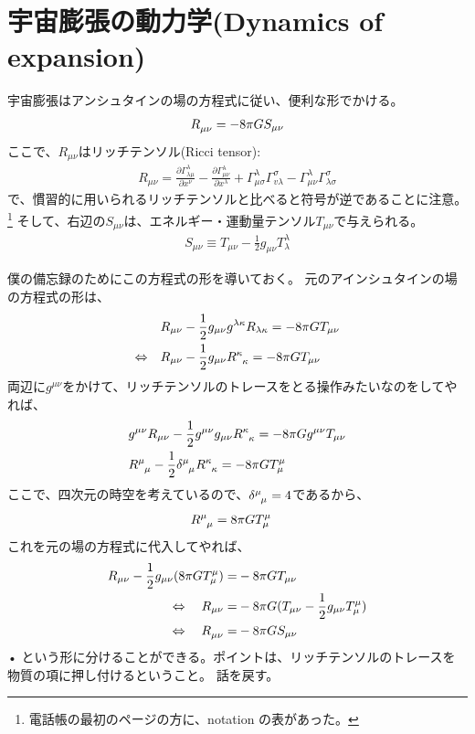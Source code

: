 \documentclass[11pt,a4paper,dvipdfmx]{jsarticle}
\theoremstyle{plain}
\theoremstyle{break}
\begin{document}
\section{宇宙膨張の動力学(Dynamics of expansion)}\label{sec:1.5Dynamics-of-expansion}
宇宙膨張はアンシュタインの場の方程式に従い、便利な形でかける。
\begin{align}
  \tensor{R}{_{\mu \nu}} = -8\pi G S_{\mu \nu}
\end{align}
ここで、$R_{\mu\nu}$はリッチテンソル(Ricci tensor):
\begin{align}
  R_{\mu \nu}=\frac{\partial \Gamma_{\lambda \mu}^{\lambda}}{\partial x^{\nu}}-\frac{\partial \Gamma_{\mu \nu}^{\lambda}}{\partial x^{\lambda}}+\Gamma_{\mu \sigma}^{\lambda} \Gamma_{v \lambda}^{\sigma}-\Gamma_{\mu \nu}^{\lambda} \Gamma_{\lambda \sigma}^{\sigma}
\end{align}
で、慣習的に用いられるリッチテンソルと比べると符号が逆であることに注意。\footnote{電話帳の最初のページの方に、notation の表があった。}
そして、右辺の$S_{\mu\nu}$は、エネルギー・運動量テンソル$T_{\mu\nu}$で与えられる。
\begin{align}
  S_{\mu \nu} \equiv T_{\mu \nu}-\frac{1}{2} g_{\mu \nu} T_{\lambda}^{\lambda}
\end{align}

僕の備忘録のためにこの方程式の形を導いておく。
元のアインシュタインの場の方程式の形は、
\begin{align}
  &R_{\mu \nu}-\frac{1}{2} g_{\mu \nu} g^{\lambda \kappa} R_{\lambda \kappa}=-8 \pi G T_{\mu \nu} \\
  \Leftrightarrow \quad  & R_{\mu \nu}-\frac{1}{2} g_{\mu \nu} \tensor{R}{^\kappa _\kappa}=-8 \pi G T_{\mu \nu}
\end{align}
両辺に$g^{\mu \nu}$をかけて、リッチテンソルのトレースをとる操作みたいなのをしてやれば、
\begin{align}
  & g^{\mu \nu} R_{\mu \nu}-\frac{1}{2} g^{\mu \nu} g_{\mu \nu} \tensor{R}{^\kappa _\kappa}=-8 \pi G g^{\mu \nu} T_{\mu \nu} \\
  & \tensor{R}{^{\mu} _{\mu}}-\frac{1}{2}  \tensor{\delta}{^\mu _\mu} \tensor{R}{^{\kappa} _{\kappa}}=-8 \pi G T^{\mu}_{\mu}
\end{align}
ここで、四次元の時空を考えているので、$ \tensor{\delta}{^\mu _\mu} = 4$であるから、
\begin{align}
&\tensor{R}{^{\mu} _{\mu}} =  8 \pi G T^{\mu}_{\mu}
\end{align}
これを元の場の方程式に代入してやれば、
\begin{align}
  R_{\mu \nu}-\frac{1}{2} g_{\mu \nu} (8 \pi G T^{\mu}_{\mu} ) =&-8 \pi G T_{\mu \nu} \\
  \Leftrightarrow  \quad
  R_{\mu \nu}=&-8 \pi G (T_{\mu \nu} -\frac{1}{2} g_{\mu \nu}  T^{\mu}_{\mu} )\\
  \Leftrightarrow  \quad
    \tensor{R}{_{\mu \nu}} =& -8\pi G S_{\mu \nu}
\end{align}•%
という形に分けることができる。ポイントは、リッチテンソルのトレースを物質の項に押し付けるということ。
話を戻す。
\end{document}
